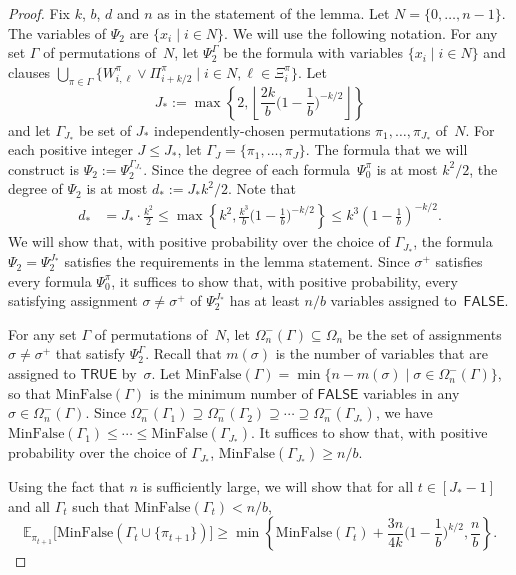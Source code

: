 \documentclass[11pt]{article}
\theoremstyle{definition}
\theoremstyle{remark}
\newcommand{\E}{\mathbb{E}}
\def\TRUE{\mathsf{TRUE}}
\def\FALSE{\mathsf{FALSE}}
\def\notalltrue{\Omega_n^-}
\def\minfalse{\mathrm{MinFalse}}
\begin{document}
\begin{proof}
Fix $k$, $b$, $d$ and $n$ as in the statement of the lemma. Let $N = \{0,\ldots,n-1\}$. The variables of $\Psi_2$ 
are $\{ x_i \mid i\in N\}$.
We will use the following notation. For any set $\Gamma$ of permutations of~$N$,
let $\Psi_2^{\Gamma}$ be the formula with variables $\{ x_i \mid i\in N\}$ and clauses $\bigcup_{\pi \in \Gamma} \{  W_{i,\ell}^\pi \vee \Pi_{i+k/2}^\pi \mid {i \in  N}, {\ell \in \Xi_{i}^\pi}  \} $.
Let \[J_*:= \max\left\{ 2, \left\lfloor \frac{2k}{b}\big(1-\frac{1}{b}\big)^{-k/2}\right\rfloor\right\}\]
and let $\Gamma_{J_*}$ be set of 
$J_*$ independently-chosen
permutations $\pi_1,\ldots,\pi_{J_*}$ of~$N$. For each positive integer $J\leq J_*$,
let  $\Gamma_J = \{ \pi_1,\ldots,\pi_J\}$.
The formula that we will construct is $\Psi_2 := \Psi_2^{\Gamma_{J_*}}$.
Since the degree of each formula~$\Psi_0^{\pi}$ is at most $k^2/2$, 
the degree of $\Psi_2$
is at most $d_* := J_* k^2/2$.
Note that 
 \begin{align*}
        d_* &= J_*\cdot \frac{k^2}{2} \le \max\left\{ 
          k^2,  \frac{k^3}{b}\big(1-\frac{1}{b}\big)^{-k/2}
        \right\}
        \le 
        k^3(1-\frac{1}{b})^{-k/2}.
    \end{align*}
We will show that, with positive probability over the choice of   $\Gamma_{J_*}$,  
the formula 
$\Psi_2 = \Psi_2^{J_*}$ 
satisfies the requirements in the lemma statement.
Since $\sigma^+$ 
satisfies every formula $\Psi_0^{\pi}$, it suffices to show that,  
with  positive probability, every satisfying assignment $\sigma\neq\sigma^+$ of $\Psi_2^{J_*}$ has at least $n/b$ variables assigned to~$\FALSE$. 

 


For any set $\Gamma$ of permutations of~$N$, let 
$\notalltrue(\Gamma) \subseteq \Omega_n$
be the set of assignments $\sigma \neq \sigma^+$ that satisfy $\Psi_2^{\Gamma}$.
Recall that $m(\sigma)$ is the number of variables that are assigned to $\TRUE$ by~$\sigma$. 
Let $\minfalse(\Gamma) =  \min\{n-m(\sigma) \mid  \sigma\in \notalltrue (\Gamma) \} $, so that $\minfalse(\Gamma)$ is the minimum number of $\FALSE$ variables in any $ \sigma\in \notalltrue (\Gamma)$.
Since 
$\notalltrue(\Gamma_1) \supseteq 
\notalltrue(\Gamma_2 ) \supseteq \cdots \supseteq 
\notalltrue(\Gamma_{J_*} )$,
 we have $\minfalse(\Gamma_1) \leq \cdots \leq \minfalse(\Gamma_{J_*})$.
It suffices to show that, with positive probability over the choice of  $\Gamma_{J_*}$,   
$\minfalse(\Gamma_{J_*}) \ge n/b$.
 

Using the fact that $n$ is sufficiently large, we will show that for all $t\in [J_*-1]$ and all $\Gamma_t$ such that $\minfalse(\Gamma_t) < n/b$,
\begin{equation}
\label{eq: E increment}
\E_{\pi_{t+1}}\big[\minfalse(\Gamma_{t}\cup\{\pi_{t+1}\})   
\big] \ge \min\left\{ \minfalse(\Gamma_t) + \frac{3n}{4k} \big(1-\frac{1}{b}\big)^{k/2}, \frac{n}{b} \right\}.    
\end{equation}



\end{proof}
\end{document}
